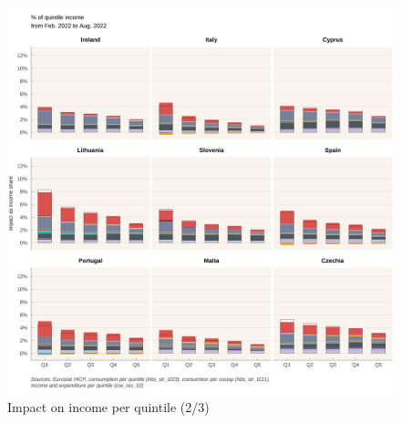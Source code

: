\documentclass[
  9pt,
  a4paper,
  numbers=noendperiod,
  DIV=12]{scrartcl}
\begin{document}
\begin{figure}[htb]

\caption{\label{fig-impact2}Impact on income per quintile (2/3)}

{\centering \includegraphics[width=1\textwidth,height=\textheight]{SIWU_brief_files/figure-pdf/fig-impact2-1.png}

}

\end{figure}
\end{document}
